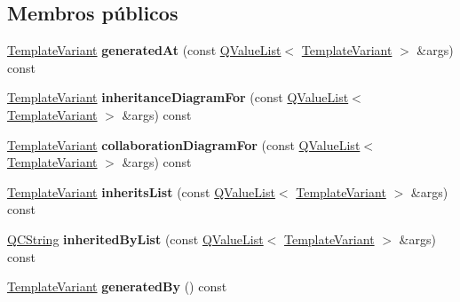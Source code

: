 \subsection*{Membros públicos}
\begin{DoxyCompactItemize}
\item 
\hypertarget{class_translate_context_1_1_private_ae0efca6b4938869d085f36249c650656}{\hyperlink{class_template_variant}{Template\-Variant} {\bfseries generated\-At} (const \hyperlink{class_q_value_list}{Q\-Value\-List}$<$ \hyperlink{class_template_variant}{Template\-Variant} $>$ \&args) const }\label{class_translate_context_1_1_private_ae0efca6b4938869d085f36249c650656}

\item 
\hypertarget{class_translate_context_1_1_private_a8ee127a97a8256943ca50a7d44d02ca7}{\hyperlink{class_template_variant}{Template\-Variant} {\bfseries inheritance\-Diagram\-For} (const \hyperlink{class_q_value_list}{Q\-Value\-List}$<$ \hyperlink{class_template_variant}{Template\-Variant} $>$ \&args) const }\label{class_translate_context_1_1_private_a8ee127a97a8256943ca50a7d44d02ca7}

\item 
\hypertarget{class_translate_context_1_1_private_ad5e9f1d7c503b672115c8c87ffc774e7}{\hyperlink{class_template_variant}{Template\-Variant} {\bfseries collaboration\-Diagram\-For} (const \hyperlink{class_q_value_list}{Q\-Value\-List}$<$ \hyperlink{class_template_variant}{Template\-Variant} $>$ \&args) const }\label{class_translate_context_1_1_private_ad5e9f1d7c503b672115c8c87ffc774e7}

\item 
\hypertarget{class_translate_context_1_1_private_a189cb6e1bff179cbee4b78d84d4cc714}{\hyperlink{class_template_variant}{Template\-Variant} {\bfseries inherits\-List} (const \hyperlink{class_q_value_list}{Q\-Value\-List}$<$ \hyperlink{class_template_variant}{Template\-Variant} $>$ \&args) const }\label{class_translate_context_1_1_private_a189cb6e1bff179cbee4b78d84d4cc714}

\item 
\hypertarget{class_translate_context_1_1_private_a25f2e6c149759c214b1139d581f08715}{\hyperlink{class_q_c_string}{Q\-C\-String} {\bfseries inherited\-By\-List} (const \hyperlink{class_q_value_list}{Q\-Value\-List}$<$ \hyperlink{class_template_variant}{Template\-Variant} $>$ \&args) const }\label{class_translate_context_1_1_private_a25f2e6c149759c214b1139d581f08715}

\item 
\hypertarget{class_translate_context_1_1_private_a7cc5ce4396fe1639faf106305e0b7357}{\hyperlink{class_template_variant}{Template\-Variant} {\bfseries generated\-By} () const }\label{class_translate_context_1_1_private_a7cc5ce4396fe1639faf106305e0b7357}


\end{DoxyCompactItemize}
